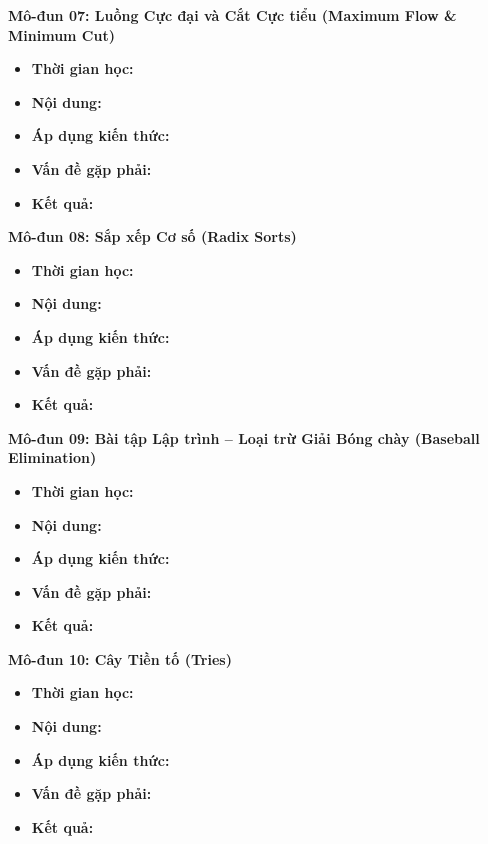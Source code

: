 \documentclass[11pt, a4paper]{article}
\begin{document}
\vspace{0.15cm}

\noindent\textbf{Mô-đun 07: Luồng Cực đại và Cắt Cực tiểu (Maximum Flow \& Minimum Cut)}
\begin{itemize}
    \item \textbf{Thời gian học:} 
    \item \textbf{Nội dung:} 
    \item \textbf{Áp dụng kiến thức:} 
    \item \textbf{Vấn đề gặp phải:} 
    \item \textbf{Kết quả:} 
\end{itemize}

\vspace{0.15cm}

\noindent\textbf{Mô-đun 08: Sắp xếp Cơ số (Radix Sorts)}
\begin{itemize}
    \item \textbf{Thời gian học:} 
    \item \textbf{Nội dung:} 
    \item \textbf{Áp dụng kiến thức:} 
    \item \textbf{Vấn đề gặp phải:} 
    \item \textbf{Kết quả:} 
\end{itemize}

\vspace{0.15cm}

\noindent\textbf{Mô-đun 09: Bài tập Lập trình -- Loại trừ Giải Bóng chày (Baseball Elimination)}
\begin{itemize}
    \item \textbf{Thời gian học:} 
    \item \textbf{Nội dung:} 
    \item \textbf{Áp dụng kiến thức:} 
    \item \textbf{Vấn đề gặp phải:} 
    \item \textbf{Kết quả:} 
\end{itemize}

\vspace{0.15cm}

\noindent\textbf{Mô-đun 10: Cây Tiền tố (Tries)}
\begin{itemize}
    \item \textbf{Thời gian học:} 
    \item \textbf{Nội dung:} 
    \item \textbf{Áp dụng kiến thức:} 
    \item \textbf{Vấn đề gặp phải:} 
    \item \textbf{Kết quả:} 
\end{itemize}
\end{document}
